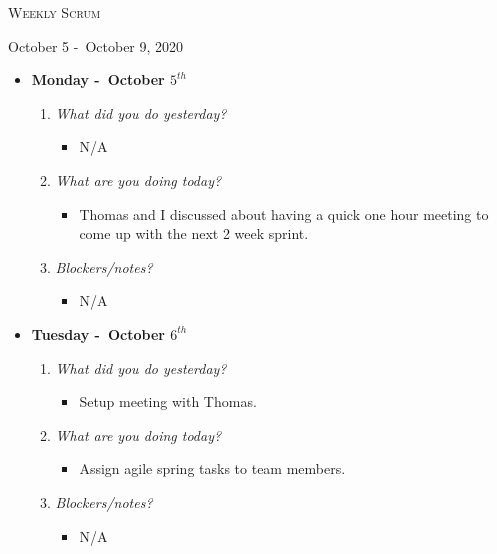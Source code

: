 \centerline{\LARGE\textsc{Weekly Scrum}}
\centerline{October 5 -\ October 9, 2020}
\textbf{}
\begin{itemize}
  \item[] \textbf{\large Monday -\ October \(5^{th}\)}
  \begin{enumerate}
    \item \textsl{What did you do yesterday?}
    \begin{itemize}
      \item N/A
    \end{itemize}
    \item \textsl{What are you doing today?}
    \begin{itemize}
      \item Thomas and I discussed about having a quick one hour meeting to come up with the next 2 week sprint.
    \end{itemize}
    \item \textsl{Blockers/notes?}
    \begin{itemize}
      \item N/A 
    \end{itemize}
  \end{enumerate}
\end{itemize}
\textbf{}
\begin{itemize}
  \item[] \textbf{\large Tuesday -\ October \(6^{th}\)}
  \begin{enumerate}
    \item \textsl{What did you do yesterday?}
    \begin{itemize}
      \item Setup meeting with Thomas.
    \end{itemize}
    \item \textsl{What are you doing today?}
    \begin{itemize}
      \item Assign agile spring tasks to team members.
    \end{itemize}
    \item \textsl{Blockers/notes?}
    \begin{itemize}
      \item N/A
    \end{itemize}
  \end{enumerate}
\end{itemize}
\textbf{}

